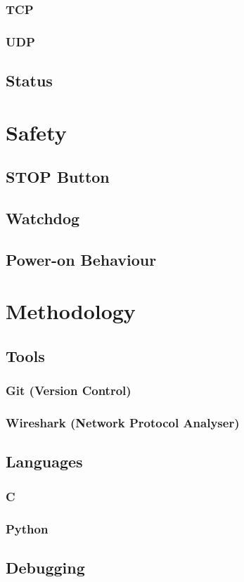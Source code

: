 			\subsubsection{TCP}
			
			\subsubsection{UDP}
		
		\subsection{Status}
	
	\section{Safety}
		
		\subsection{STOP Button}
		
		\subsection{Watchdog}
		
		\subsection{Power-on Behaviour}
	
	\section{Methodology}
		
		\subsection{Tools}
			
			\subsubsection{Git (Version Control)}
			
			\subsubsection{Wireshark (Network Protocol Analyser)}
		
		\subsection{Languages}
			
			\subsubsection{C}
			
			\subsubsection{Python}
		
		\subsection{Debugging}
